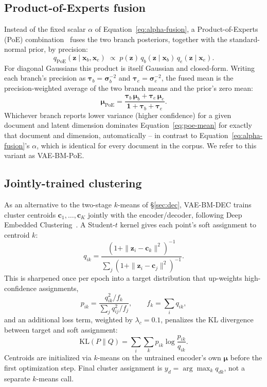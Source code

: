 \documentclass[11pt]{article}
\begin{document}
\subsection{Product-of-Experts fusion}
Instead of the fixed scalar $\alpha$ of Equation~\ref{eq:alpha-fusion}, a Product-of-Experts (PoE) combination~\citep{hinton2002poe} fuses the two branch posteriors, together with the standard-normal prior, by precision:
\begin{equation}
q_{\mathrm{PoE}}(\mathbf{z}\mid\mathbf{x}_b,\mathbf{x}_e) \;\propto\; p(\mathbf{z})\,q_b(\mathbf{z}\mid\mathbf{x}_b)\,q_e(\mathbf{z}\mid\mathbf{x}_e).
\label{eq:poe-def}
\end{equation}
For diagonal Gaussians this product is itself Gaussian and closed-form. Writing each branch's precision as $\boldsymbol{\tau}_b=\boldsymbol{\sigma}_b^{-2}$ and $\boldsymbol{\tau}_e=\boldsymbol{\sigma}_e^{-2}$, the fused mean is the precision-weighted average of the two branch means and the prior's zero mean:
\begin{equation}
\boldsymbol{\mu}_{\mathrm{PoE}} = \frac{\boldsymbol{\tau}_b\,\boldsymbol{\mu}_b+\boldsymbol{\tau}_e\,\boldsymbol{\mu}_e}{\mathbf{1}+\boldsymbol{\tau}_b+\boldsymbol{\tau}_e}.
\label{eq:poe-mean}
\end{equation}
Whichever branch reports lower variance (higher confidence) for a given document and latent dimension dominates Equation~\ref{eq:poe-mean} for exactly that document and dimension, automatically -- in contrast to Equation~\ref{eq:alpha-fusion}'s $\alpha$, which is identical for every document in the corpus. We refer to this variant as VAE-BM-PoE.

\subsection{Jointly-trained clustering}
As an alternative to the two-stage $k$-means of \S\ref{sec:dec}, VAE-BM-DEC trains cluster centroids $\mathbf{c}_1,\dots,\mathbf{c}_K$ jointly with the encoder/decoder, following Deep Embedded Clustering~\citep{xie2016dec}. A Student-$t$ kernel gives each point's soft assignment to centroid $k$:
\begin{equation}
q_{ik} = \frac{\left(1+\|\mathbf{z}_i-\mathbf{c}_k\|^2\right)^{-1}}{\sum_j\left(1+\|\mathbf{z}_i-\mathbf{c}_j\|^2\right)^{-1}}.
\label{eq:dec-q}
\end{equation}
This is sharpened once per epoch into a target distribution that up-weights high-confidence assignments,
\begin{equation}
p_{ik} = \frac{q_{ik}^2/f_k}{\sum_j q_{ij}^2/f_j}, \qquad f_k=\sum_i q_{ik},
\label{eq:dec-p}
\end{equation}
and an additional loss term, weighted by $\lambda_c=0.1$, penalizes the KL divergence between target and soft assignment:
\begin{equation}
\mathrm{KL}(P\|Q) = \sum_i\sum_k p_{ik}\log\frac{p_{ik}}{q_{ik}}.
\label{eq:dec-kl}
\end{equation}
Centroids are initialized via $k$-means on the untrained encoder's own $\boldsymbol{\mu}$ before the first optimization step. Final cluster assignment is $y_d=\arg\max_k q_{dk}$, not a separate $k$-means call.
\end{document}
